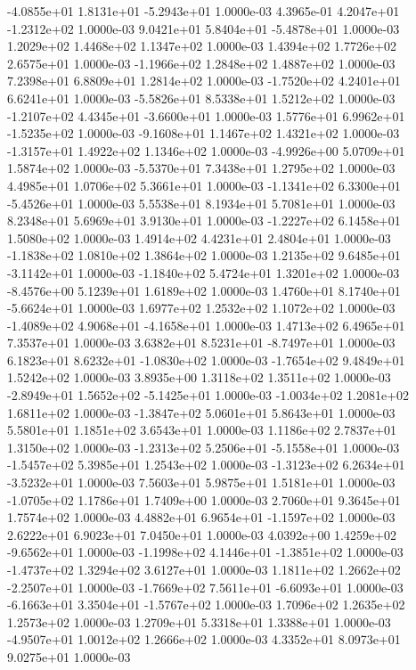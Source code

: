 -4.0855e+01  1.8131e+01 -5.2943e+01  1.0000e-03
 4.3965e-01  4.2047e+01 -1.2312e+02  1.0000e-03
 9.0421e+01  5.8404e+01 -5.4878e+01  1.0000e-03
1.2029e+02 1.4468e+02 1.1347e+02  1.0000e-03
1.4394e+02 1.7726e+02 2.6575e+01  1.0000e-03
-1.1966e+02  1.2848e+02  1.4887e+02  1.0000e-03
7.2398e+01 6.8809e+01 1.2814e+02  1.0000e-03
-1.7520e+02  4.2401e+01  6.6241e+01  1.0000e-03
-5.5826e+01  8.5338e+01  1.5212e+02  1.0000e-03
-1.2107e+02  4.4345e+01 -3.6600e+01  1.0000e-03
 1.5776e+01  6.9962e+01 -1.5235e+02  1.0000e-03
-9.1608e+01  1.1467e+02  1.4321e+02  1.0000e-03
-1.3157e+01  1.4922e+02  1.1346e+02  1.0000e-03
-4.9926e+00  5.0709e+01  1.5874e+02  1.0000e-03
-5.5370e+01  7.3438e+01  1.2795e+02  1.0000e-03
4.4985e+01 1.0706e+02 5.3661e+01  1.0000e-03
-1.1341e+02  6.3300e+01 -5.4526e+01  1.0000e-03
5.5538e+01 8.1934e+01 5.7081e+01  1.0000e-03
8.2348e+01 5.6969e+01 3.9130e+01  1.0000e-03
-1.2227e+02  6.1458e+01  1.5080e+02  1.0000e-03
1.4914e+02 4.4231e+01 2.4804e+01  1.0000e-03
-1.1838e+02  1.0810e+02  1.3864e+02  1.0000e-03
 1.2135e+02  9.6485e+01 -3.1142e+01  1.0000e-03
-1.1840e+02  5.4724e+01  1.3201e+02  1.0000e-03
-8.4576e+00  5.1239e+01  1.6189e+02  1.0000e-03
 1.4760e+01  8.1740e+01 -5.6624e+01  1.0000e-03
1.6977e+02 1.2532e+02 1.1072e+02  1.0000e-03
-1.4089e+02  4.9068e+01 -4.1658e+01  1.0000e-03
1.4713e+02 6.4965e+01 7.3537e+01  1.0000e-03
 3.6382e+01  8.5231e+01 -8.7497e+01  1.0000e-03
 6.1823e+01  8.6232e+01 -1.0830e+02  1.0000e-03
-1.7654e+02  9.4849e+01  1.5242e+02  1.0000e-03
3.8935e+00 1.3118e+02 1.3511e+02  1.0000e-03
-2.8949e+01  1.5652e+02 -5.1425e+01  1.0000e-03
-1.0034e+02  1.2081e+02  1.6811e+02  1.0000e-03
-1.3847e+02  5.0601e+01  5.8643e+01  1.0000e-03
5.5801e+01 1.1851e+02 3.6543e+01  1.0000e-03
1.1186e+02 2.7837e+01 1.3150e+02  1.0000e-03
-1.2313e+02  5.2506e+01 -5.1558e+01  1.0000e-03
-1.5457e+02  5.3985e+01  1.2543e+02  1.0000e-03
-1.3123e+02  6.2634e+01 -3.5232e+01  1.0000e-03
7.5603e+01 5.9875e+01 1.5181e+01  1.0000e-03
-1.0705e+02  1.1786e+01  1.7409e+00  1.0000e-03
2.7060e+01 9.3645e+01 1.7574e+02  1.0000e-03
 4.4882e+01  6.9654e+01 -1.1597e+02  1.0000e-03
2.6222e+01 6.9023e+01 7.0450e+01  1.0000e-03
 4.0392e+00  1.4259e+02 -9.6562e+01  1.0000e-03
-1.1998e+02  4.1446e+01 -1.3851e+02  1.0000e-03
-1.4737e+02  1.3294e+02  3.6127e+01  1.0000e-03
 1.1811e+02  1.2662e+02 -2.2507e+01  1.0000e-03
-1.7669e+02  7.5611e+01 -6.6093e+01  1.0000e-03
-6.1663e+01  3.3504e+01 -1.5767e+02  1.0000e-03
1.7096e+02 1.2635e+02 1.2573e+02  1.0000e-03
1.2709e+01 5.3318e+01 1.3388e+01  1.0000e-03
-4.9507e+01  1.0012e+02  1.2666e+02  1.0000e-03
4.3352e+01 8.0973e+01 9.0275e+01  1.0000e-03
